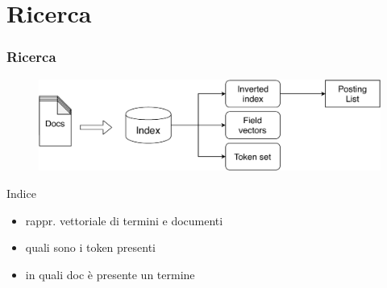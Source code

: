 \documentclass{beamer}
\begin{document}
	\section{Ricerca}
	\begin{frame}
		\frametitle{Ricerca}
		\begin{figure}
			\centering
			\includegraphics[width=\textwidth]{img/indice.pdf}
		\end{figure}
		Indice	
		\begin{itemize}
			\item rappr. vettoriale di termini e documenti
				\item quali sono i token presenti
				\item in quali doc è presente un termine
			\end{itemize}
	\end{frame}
\end{document}
